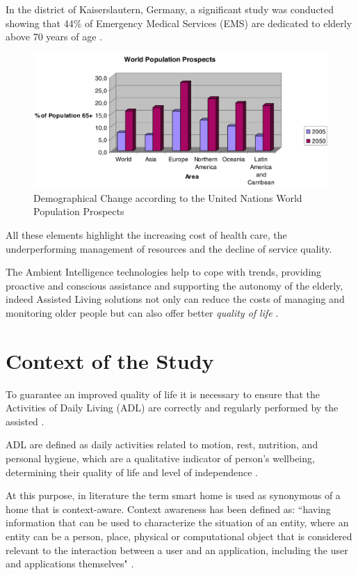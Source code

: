 \documentclass{thesisreport}
\begin{document}
 In the district of Kaiserslautern, Germany, a significant study was conducted showing that 44\% of Emergency Medical Services (EMS) are dedicated to elderly above 70 years of age \cite{kleinberger2007ambient}.
 	\begin{figure}[H]
		\centering
		\includegraphics[width=15cm]{Thesis/data/populationProspect.png}
		\caption{\small{Demographical Change according to the United Nations World Population Prospects \cite{kleinberger2007ambient}}}
		\label{fig:populationProspect}
	\end{figure}
 All these elements highlight the increasing cost of health care, the underperforming management of resources and the decline of service quality.
 
 \parskip  \parskip
 
 The Ambient Intelligence technologies help to cope with trends, providing proactive and conscious assistance and supporting the autonomy of the elderly, indeed Assisted Living solutions not only can reduce the costs of managing and monitoring older people but can also offer better \textit{quality of life} \cite{kleinberger2007ambient}.
 
 \section{Context of the Study}
 \label{sec: context of study}
  To guarantee an improved quality of life it is necessary to ensure that the Activities of Daily Living (ADL) are correctly and regularly performed by the assisted \cite{buoncompagni2017towards}.
 
 ADL are defined as daily activities related to motion, rest, nutrition, and personal hygiene, which are a qualitative indicator of person’s wellbeing, determining their quality of life and level of independence \cite{buoncompagni2017towards}. 
 
 At this purpose, in literature the term smart home is used as synonymous of a home that is context-aware. Context awareness has been defined as: ``having information that can be used to characterize the situation of an entity, where an entity can be a person, place, physical or computational object that is considered relevant to the interaction between a user and an application, including the user and applications themselves" \cite{abowd1999towards}.  
\end{document}
